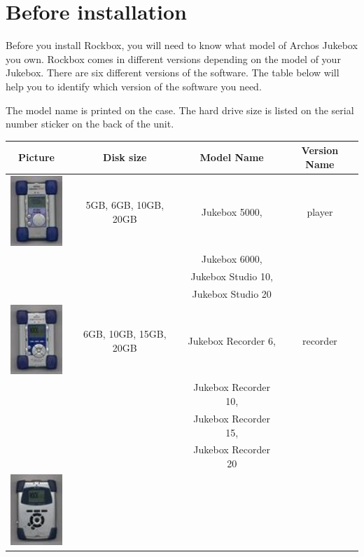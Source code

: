 \section{Before installation}

Before you install Rockbox, you will need to know what model of Archos Jukebox
you own.  Rockbox comes in different versions depending on the model of your
Jukebox.  There are six different versions of the software.  The table below
will help you to identify which version of the software you need.

The model name is printed on the case.  The hard drive size is listed on the
serial number sticker on the back of the unit.

\begin{center}
  \begin{tabular}{@{}cccc@{}}\toprule
    \label{ref:Jukeboxtypetable}
    \textbf{Picture} & \textbf{Disk size} & \textbf{Model Name} & \textbf{Version Name} \\\midrule
    \includegraphics[width=2cm]{getting_started/images/archos-studio-small.png}
    & 5GB, 6GB, 10GB, 20GB & Jukebox 5000, & player\\
                         & & Jukebox 6000, & \\
                         & & Jukebox Studio 10, & \\
                         & & Jukebox Studio 20 & \\\midrule
    \includegraphics[width=2cm]{getting_started/images/archos-recorder-small.png}
    & 6GB, 10GB, 15GB, 20GB & Jukebox Recorder 6, & recorder\\
                          & & Jukebox Recorder 10, & \\
                          & & Jukebox Recorder 15, & \\
                          & & Jukebox Recorder 20 & \\\midrule
    \includegraphics[width=2cm]{getting_started/images/archos-recorderv2-small.png}

\end{tabular}
\end{center}
